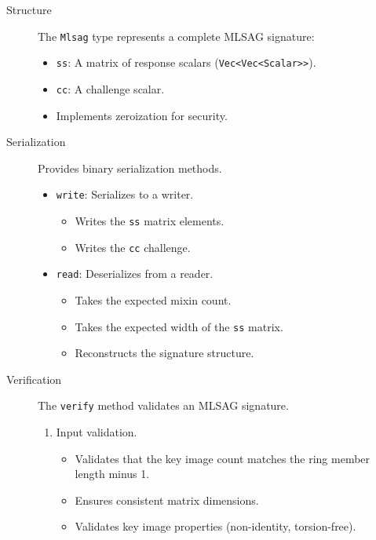 \begin{description}
\item[Structure] \hfill 

The \texttt{Mlsag} type represents a complete MLSAG signature:
\begin{itemize}
\item \texttt{ss}: A matrix of response scalars (\texttt{Vec<Vec<Scalar>>}).  
\item \texttt{cc}: A challenge scalar.  
\item Implements zeroization for security.  
\end{itemize}

\item[Serialization] \hfill

Provides binary serialization methods.  
\begin{itemize}
\item \texttt{write}: Serializes to a writer. %
  \begin{itemize}
  \item Writes the \texttt{ss} matrix elements.  
  \item Writes the \texttt{cc} challenge.  
  \end{itemize}
\item \texttt{read}: Deserializes from a reader. %
  \begin{itemize}
  \item Takes the expected mixin count.  
  \item Takes the expected width of the \texttt{ss} matrix.  
  \item Reconstructs the signature structure.  
  \end{itemize}
\end{itemize}

\item[Verification] \hfill 

The \texttt{verify} method validates an MLSAG signature.  
\begin{enumerate}
\item Input validation.  
  \begin{itemize}
  \item Validates that the key image count matches the ring member length minus 1.  
  \item Ensures consistent matrix dimensions.  
  \item Validates key image properties (non-identity, torsion-free).  
  \end{itemize}


\end{enumerate}
\end{description}

